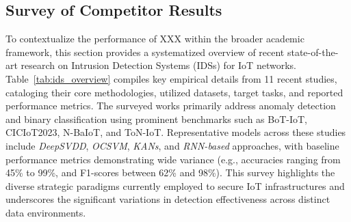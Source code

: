 \documentclass[final,twocolumn,10pt]{elsarticle}
\begin{document}
\subsection{Survey of Competitor Results}
\label{ap2:competitor_results}

To contextualize the performance of XXX within the broader academic framework, this section provides a systematized overview of recent state-of-the-art research on Intrusion Detection Systems (IDSs) for IoT networks. Table~\ref{tab:ids_overview} compiles key empirical details from 11 recent studies, cataloging their core methodologies, utilized datasets, target tasks, and reported performance metrics. The surveyed works primarily address anomaly detection and binary classification using prominent benchmarks such as BoT-IoT, CICIoT2023, N-BaIoT, and ToN-IoT. Representative models across these studies include \textit{DeepSVDD}, \textit{OCSVM}, \textit{KANs}, and \textit{RNN-based} approaches, with baseline performance metrics demonstrating wide variance (e.g., accuracies ranging from 45\% to 99\%, and F1-scores between 62\% and 98\%). This survey highlights the diverse strategic paradigms currently employed to secure IoT infrastructures and underscores the significant variations in detection effectiveness across distinct data environments.
\end{document}
